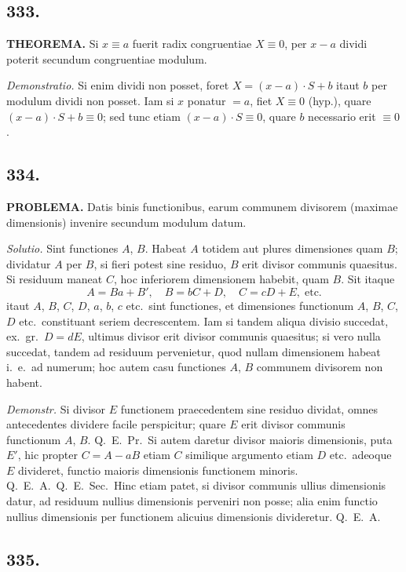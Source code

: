 \documentclass[12pt]{article}
\begin{document}
\subsection*{333.}

\textbf{THEOREMA.} Si $x\equiv a$ fuerit radix congruentiae $X\equiv 0$, per $x-a$ dividi poterit secundum congruentiae modulum.

\textit{Demonstratio.} Si enim dividi non posset, foret $X=(x-a)\cdot S+b$ itaut $b$ per modulum dividi non posset. Iam si $x$ ponatur $=a$, fiet $X\equiv 0$ (hyp.), quare $(x-a)\cdot S+b\equiv 0$; sed tunc etiam $(x-a)\cdot S\equiv 0$, quare $b$ necessario erit $\equiv 0$.

\subsection*{334.}

\textbf{PROBLEMA.} Datis binis functionibus, earum communem divisorem (maximae dimensionis) invenire secundum modulum datum.

\textit{Solutio.} Sint functiones $A$, $B$. Habeat $A$ totidem aut plures dimensiones quam $B$; dividatur $A$ per $B$, si fieri potest sine residuo, $B$ erit divisor communis quaesitus. Si residuum maneat $C$, hoc inferiorem dimensionem habebit, quam $B$. Sit itaque
\[
A = Ba + B',\quad B = bC + D,\quad C = cD + E,\; \text{etc.}
\]
itaut $A$, $B$, $C$, $D$, $a$, $b$, $c$ etc.~sint functiones, et dimensiones functionum $A$, $B$, $C$, $D$ etc.~constituant seriem decrescentem. Iam si tandem aliqua divisio succedat, ex.~gr.~$D=dE$, ultimus divisor erit divisor communis quaesitus; si vero nulla succedat, tandem ad residuum pervenietur, quod nullam dimensionem habeat i.~e.~ad numerum; hoc autem casu functiones $A$, $B$ communem divisorem non habent.

\textit{Demonstr.} Si divisor $E$ functionem praecedentem sine residuo dividat, omnes antecedentes dividere facile perspicitur; quare $E$ erit divisor communis functionum $A$, $B$. Q.~E.~Pr.~Si autem daretur divisor maioris dimensionis, puta $E'$, hic propter $C=A-aB$ etiam $C$ similique argumento etiam $D$ etc.~adeoque $E$ divideret, functio maioris dimensionis functionem minoris. Q.~E.~A.~Q.~E.~Sec.~Hinc etiam patet, si divisor communis ullius dimensionis datur, ad residuum nullius dimensionis perveniri non posse; alia enim functio nullius dimensionis per functionem alicuius dimensionis divideretur. Q.~E.~A.

\subsection*{335.}
\end{document}
